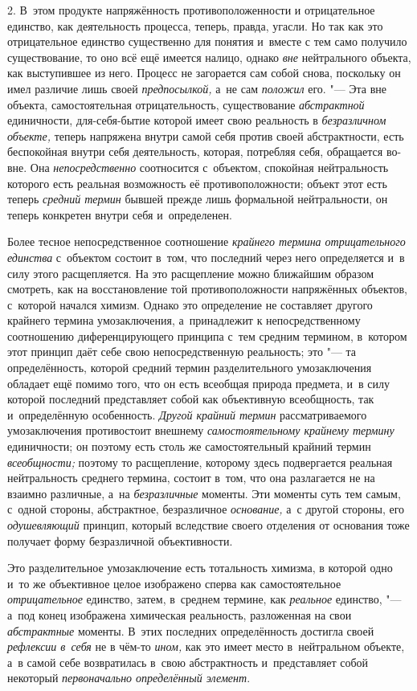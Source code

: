 2. В~этом продукте напряжённость противоположенности и
отрицательное единство, как деятельность процесса, теперь, правда, угасли.
Но так как это отрицательное единство существенно для понятия и~вместе с
тем само получило существование, то оно всё ещё имеется налицо, однако
{\em вне} нейтрального
объекта, как выступившее из него. Процесс не загорается сам собой снова,
поскольку он имел различие лишь своей
{\em предпосылкой,} а~не
сам {\em положил} его. "---
Эта вне объекта, самостоятельная отрицательность,
существование {\em абстрактной}
единичности, для-себя-бытие которой имеет свою реальность в
{\em безразличном объекте,}
теперь напряжена внутри самой себя против своей
абстрактности, есть беспокойная внутри себя деятельность, которая,
потребляя себя, обращается во-вне. Она
{\em непосредственно}
соотносится с~объектом, спокойная нейтральность которого есть
реальная возможность её противоположности; объект этот есть теперь
{\em средний термин}
бывшей прежде лишь формальной нейтральности, он теперь
конкретен внутри себя и~определенен.

Более тесное непосредственное соотношение
{\em крайнего термина отрицательного
единства} с~объектом состоит в~том, что последний через него
определяется и~в силу этого расщепляется. На это расщепление можно
ближайшим образом смотреть, как на восстановление той противоположности
напряжённых объектов, с~которой начался химизм. Однако это определение не
составляет другого крайнего термина умозаключения, а~принадлежит к
непосредственному соотношению диференцирующего принципа с~тем средним
термином, в~котором этот принцип даёт себе свою непосредственную
реальность; это "--- та определённость, которой средний термин
разделительного умозаключения обладает ещё помимо того, что он есть
всеобщая природа предмета, и~в силу которой последний представляет собой
как объективную всеобщность, так и~определённую особенность.
{\em Другой крайний термин}
рассматриваемого умозаключения противостоит внешнему
{\em самостоятельному крайнему термину}
единичности; он поэтому есть столь же самостоятельный крайний
термин {\em всеобщности;}
поэтому то расщепление, которому здесь подвергается реальная
нейтральность среднего термина, состоит в~том, что она разлагается не на
взаимно различные, а~на
{\em безразличные}
моменты. Эти моменты суть тем самым, с~одной стороны,
абстрактное, безразличное
{\em основание,} а~с
другой стороны, его {\em одушевляющий}
принцип, который вследствие своего отделения
от основания тоже получает форму безразличной объективности.

Это разделительное умозаключение есть тотальность химизма, в
которой одно и~то же объективное целое изображено сперва как
самостоятельное {\em отрицательное}
единство, затем, в~среднем термине, как
{\em реальное} единство,
"--- а~под конец изображена химическая реальность, разложенная
на свои {\em абстрактные}
моменты. В~этих последних определённость достигла своей
{\em рефлексии в~себя} не
в чём-то {\em ином,}
как это имеет место в~нейтральном объекте, а~в самой себе
возвратилась в~свою абстрактность и~представляет собой некоторый
{\em первоначально определённый
элемент}.

